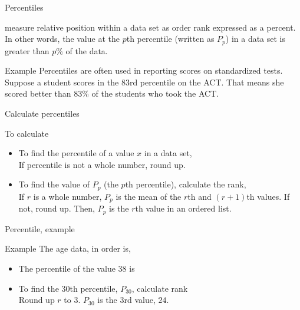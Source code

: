\documentclass[xcolor=table, aspectratio=169, bigger, handout]{beamer}
\begin{document}
\begin{frame}{Percentiles}
\begin{block}{}
 measure relative position within a data set as order rank expressed as a percent. In other words, the value at the $p$th percentile (written as $P_p$) in a data set is greater than $p$\% of the data.
\end{block}

\pause

\begin{exampleblock}{Example}
Percentiles are often used in reporting scores on standardized tests.\\
\medskip
Suppose a student scores in the 83rd percentile on the ACT. That means she scored better than 83\% of the students who took the ACT.
\end{exampleblock}
\end{frame}

\begin{frame}{Calculate percentiles}
\begin{block}{To calculate}
\begin{itemize}
\item To find the percentile of a value $x$ in a data set,\\
\smallskip
{}
\medskip
If percentile is not a whole number, round up.
\medskip
\pause\item To find the value of $P_p$ (the $p$th percentile), calculate the rank,\\
\smallskip
{}
\medskip
If $r$ is a whole number, $P_p$ is the mean of the $r$th and $(r+1)$th values. If not, round up. Then, $P_p$ is the $r$th value in an ordered list.
\end{itemize}
\end{block}
\end{frame}

\begin{frame}{Percentile, example}
\begin{exampleblock}{Example}
The age data, in order is, \\
\smallskip
{}

\begin{itemize}
\pause
\item The percentile of the value 38 is\\
\smallskip
{} 
\medskip
\pause\item To find the 30th percentile, $P_{30}$, calculate rank\\
\smallskip
{}
\medskip
Round up $r$ to $3$. $P_{30}$ is the 3rd value, $24$.
\end{itemize}
\end{exampleblock}
\end{frame}
\end{document}
